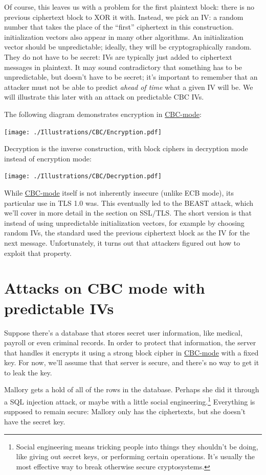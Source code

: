\documentclass[11pt,ebook,table,dvipsnames]{memoir}
\begin{document}
Of course, this leaves us with a problem for the first plaintext
block: there is no previous ciphertext block to XOR it with. Instead,
we pick an \gls{IV}: a random number that takes the place of the
\enquote{first} ciphertext in this construction. \Glspl{initialization vector}
also appear in many other algorithms. An initialization vector should
be unpredictable; ideally, they will be cryptographically random. They
do not have to be secret: IVs are typically just added to ciphertext
messages in plaintext. It may sound contradictory that something has
to be unpredictable, but doesn't have to be secret; it's important to
remember that an attacker must not be able to predict \emph{ahead of time}
what a given IV will be. We will illustrate this later with an attack
on predictable CBC IVs.

The following diagram demonstrates encryption in \hyperref[CBC mode]{CBC-mode}:

\texttt{[image: ./Illustrations/CBC/Encryption.pdf]}

Decryption is the inverse construction, with block ciphers in
decryption mode instead of encryption mode:

\texttt{[image: ./Illustrations/CBC/Decryption.pdf]}

While \hyperref[CBC mode]{CBC-mode} itself is not inherently insecure (unlike ECB mode),
its particular use in TLS 1.0 was. This eventually led to the
\gls{BEAST} attack, which we'll cover in more detail in the section on
SSL/TLS. The short version is that instead of using unpredictable
\glspl{initialization vector}, for example by choosing random IVs, the
standard used the previous ciphertext block as the IV for the next
message. Unfortunately, it turns out that attackers figured out how to
exploit that property.
\section{\label{Attacks-on-CBC-mode-with-predictable-IVs}Attacks on CBC mode with predictable IVs}
\label{sec-2-3-5}

Suppose there's a database that stores secret user information, like
medical, payroll or even criminal records. In order to protect that
information, the server that handles it encrypts it using a strong
block cipher in \hyperref[CBC mode]{CBC-mode} with a fixed key. For now, we'll assume that
that server is secure, and there's no way to get it to leak the key.

Mallory gets a hold of all of the rows in the database. Perhaps she
did it through a SQL injection attack, or maybe with a little social
engineering.\footnote{Social engineering means tricking people into things
they shouldn't be doing, like giving out secret keys, or performing
certain operations. It's usually the most effective way to break
otherwise secure cryptosystems.} Everything is supposed to remain
secure: Mallory only has the ciphertexts, but she doesn't have the
secret key.
\end{document}
